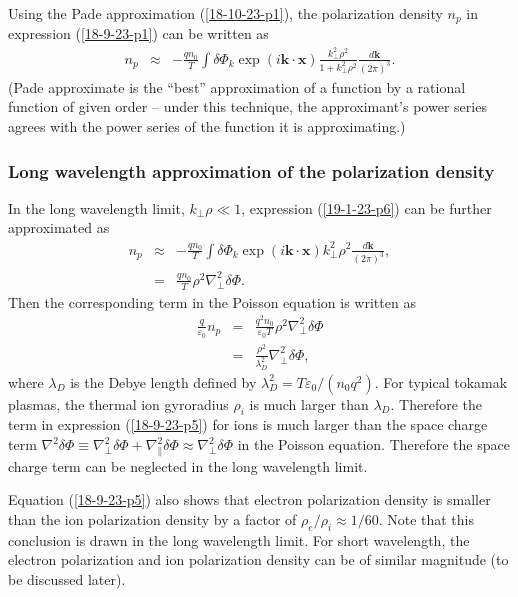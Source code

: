 \documentclass{llncs}
\begin{document}
Using the Pade approximation (\ref{18-10-23-p1}), the polarization density
$n_p$ in expression (\ref{18-9-23-p1}) can be written as
\begin{eqnarray}
  n_p & \approx & - \frac{q n_0}{T} \int \delta \Phi_k \exp (i\mathbf{k} \cdot
  \mathbf{x}) \frac{k_{\perp}^2 \rho^2}{1 + k_{\perp}^2 \rho^2}
  \frac{d\mathbf{k}}{(2 \pi)^3} .  \label{19-1-23-p6}
\end{eqnarray}
(Pade approximate is the ``best'' approximation of a function by a rational
function of given order -- under this technique, the approximant's power
series agrees with the power series of the function it is approximating.)

\subsubsection{Long wavelength approximation of the polarization density}

In the long wavelength limit, $k_{\perp} \rho \ll 1$, expression
(\ref{19-1-23-p6}) can be further approximated as
\begin{eqnarray}
  n_p & \approx & - \frac{q n_0}{T} \int \delta \Phi_k \exp (i\mathbf{k} \cdot
  \mathbf{x}) k_{\perp}^2 \rho^2 \frac{d\mathbf{k}}{(2 \pi)^3}, \nonumber\\
  & = & \frac{q n_0}{T} \rho^2 \nabla_{\perp}^2 \delta \Phi . 
  \label{19-1-23-p5}
\end{eqnarray}
Then the corresponding term in the Poisson equation is written as
\begin{eqnarray}
  \frac{q}{\varepsilon_0} n_p & = & \frac{q^2 n_0}{\varepsilon_0 T} \rho^2
  \nabla_{\perp}^2 \delta \Phi \nonumber\\
  & = & \frac{\rho^2}{\lambda_D^2} \nabla_{\perp}^2 \delta \Phi, 
  \label{18-9-23-p5}
\end{eqnarray}
where $\lambda_D$ is the Debye length defined by $\lambda_D^2 = T
\varepsilon_0 / (n_0 q^2)$. For typical tokamak plasmas, the thermal ion
gyroradius $\rho_i$ is much larger than $\lambda_D$. Therefore the term in
expression (\ref{18-9-23-p5}) for ions is much larger than the space charge
term $\nabla^2 \delta \Phi \equiv \nabla^2_{\perp} \delta \Phi +
\nabla^2_{\parallel} \delta \Phi \approx \nabla^2_{\perp} \delta \Phi$ in the
Poisson equation. Therefore the space charge term can be neglected in the long
wavelength limit.

Equation (\ref{18-9-23-p5}) also shows that electron polarization density is
smaller than the ion polarization density by a factor of $\rho_e / \rho_i
\approx 1 / 60$. Note that this conclusion is drawn in the long wavelength
limit. For short wavelength, the electron polarization and ion polarization
density can be of similar magnitude (to be discussed later).
\end{document}
